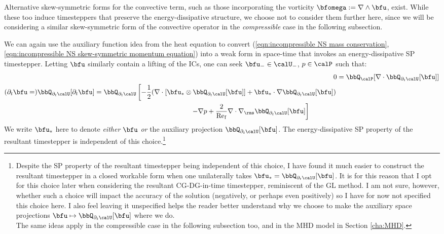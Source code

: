     \begin{remark}
        Alternative skew-symmetric forms for the convective term, such as those incorporating the vorticity $\bfomega  :=  \nabla\wedge\bfu$, exist. While these too induce timesteppers that preserve the energy-dissipative structure, we choose not to consider them further here, since we will be considering a similar skew-symmetric form of the convective operator in the \emph{compressible} case in the following subsection.
    \end{remark}

    \line

    We can again use the auxiliary function idea from the heat equation to convert (\ref{eqn:incompressible NS mass conservation}, \ref{eqn:incompressible NS skew-symmetric momentum equation}) into a weak form in space-time that invokes an energy-dissipative SP timestepper. Letting $\bfu$ similarly contain a lifting of the ICs, one can seek $\bfu_{-} \in \calU_{-}$, $p \in \calP$ such that:
    \begin{align}
            0
            &=
            \bbQ_{\calP}[\nabla\cdot\bbQ_{\partial_{t}\calU}[\bfu]]  \label{eqn:incompressible NS weak form 1}  \\
        \begin{split}
            (\partial_{t}\bfu
            =)
            \bbQ_{\partial_{t}\calU}[\partial_{t}\bfu]
            &=
            \bbQ_{\partial_{t}\calU}\left[- \frac{1}{2}(\nabla\cdot\left[\bfu_{*}\otimes\bbQ_{\partial_{t}\calU}[\bfu]\right]
            + \bfu_{*}\cdot\nabla\bbQ_{\partial_{t}\calU}[\bfu])\right.  \\
            &\qquad\qquad\qquad\qquad\qquad\qquad\qquad\left.- \nabla p
            + \frac{2}{\rmRef}\nabla\cdot\nabla_{\rms}\bbQ_{\partial_{t}\calU}[\bfu]\right]
        \end{split}  \label{eqn:incompressible NS weak form 2}
    \end{align}
    We write $\bfu_{*}$ here to denote \emph{either} $\bfu$ \emph{or} the auxiliary projection $\bbQ_{\partial_{t}\calU}[\bfu]$. The energy-dissipative SP property of the resultant timestepper is independent of this choice.\footnote{Despite the SP property of the resultant timestepper being independent of this choice, I have found it much easier to construct the resultant timestepper in a closed workable form when one unilaterally takes $\bfu_{*} = \bbQ_{\partial_{t}\calU}[\bfu]$. It is for this reason that I opt for this choice later when considering the resultant CG-DG-in-time timestepper, reminiscent of the GL method. I am not sure, however, whether such a choice will impact the accuracy of the solution (negatively, or perhaps even positively) so I have for now not specified this choice here. I also feel leaving it unspecified helps the reader better understand why we choose to make the auxiliary space projections $\bfu \mapsto \bbQ_{\partial_{t}\calU}[\bfu]$ where we do. \\ The same ideas apply in the compressible case in the following subsection too, and in the MHD model in Section \ref{cha:MHD}.}
    
